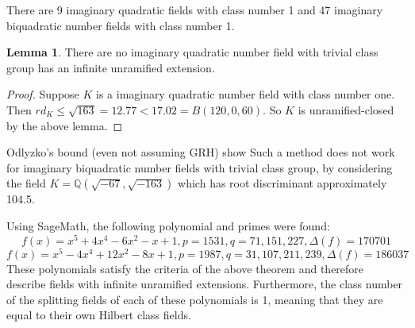 \documentclass[12pt]{extarticle}
\newcommand{\<}{\langle}
\renewcommand{\>}{\rangle}
\theoremstyle{definition}
\newtheorem{lemma}{Lemma}
\begin{document}
There are 9 imaginary quadratic fields with class number 1 and 47 imaginary biquadratic number fields with class number 1. 
\begin{lemma}
There are no imaginary quadratic number field with trivial class group has an infinite unramified extension. 
\end{lemma}
\begin{proof}
Suppose $K$ is a imaginary quadratic number field with class number one. Then $rd_K \leq \sqrt{163} = 12.77 < 17.02 = B(120,0,60)$. So $K$ is unramified-closed by the above lemma. 
\end{proof}
Odlyzko's bound (even not assuming GRH) show Such a method does not work for imaginary biquadratic number fields with trivial class group, by considering the field $K=\mathbb{Q}(\sqrt{-67},\sqrt{-163})$ which has root discriminant approximately 104.5.

Using SageMath, the following polynomial and primes were found:
\begin{equation}
    f(x)=x^5+4x^4-6x^2-x+1, p=1531,q=71,151,227,\Delta(f)=170701
\end{equation}
\begin{equation}
 f(x)=x^5-4x^4+12x^2-8x+1,p=1987,q=31,107,211,239,\Delta(f)=186037
 \end{equation}
These polynomials satisfy the criteria of the above theorem and therefore describe fields with infinite unramified extensions. Furthermore, the class number of the splitting fields of each of these polynomials is 1, meaning that they are equal to their own Hilbert class fields. \par
\end{document}
